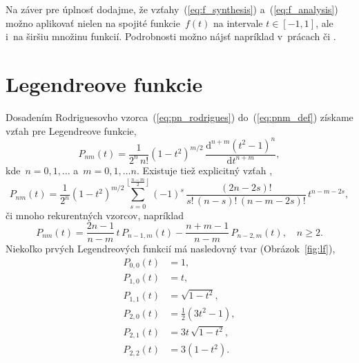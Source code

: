 \documentclass[a4paper, 12pt]{book}
\newcommand{\diff}{\mathrm d}
\begin{document}
Na záver pre úplnosť dodajme, že vzťahy~(\ref{eq:f_synthesis})
a~(\ref{eq:f_analysis}) možno aplikovať nielen na spojité funkcie~$f(t)$ na
intervale $t \in [-1, 1]$, ale i~na širšiu množinu funkcií.  Podrobnosti možno
nájsť napríklad v~prácach \textcite{Freeden2009} či \textcite{Arfken2005}.






\section{Legendreove funkcie}
\label{sec:legendre_functions}

Dosadením Rodriguesovho vzorca~(\ref{eq:pn_rodrigues}) do~(\ref{eq:pnm_def})
získame vzťah pre Legendreove funkcie,
%
\begin{equation}
\label{eq:pnm_ferrer}
P_{nm}(t) = \frac{1}{2^n \, n!} (1 - t^2)^{ m \slash 2} \, \frac{\diff^{n + m}
(t^2 - 1)^n}{\diff t^{n + m}}{,}
\end{equation}
%
kde~$n = 0, 1, \dots$ a~$m = 0, 1, \dots n$.  Existuje tiež explicitný vzťah 
\parencite{Freeden2009},
%
\begin{equation}
P_{nm}(t) = \frac{1}{2^n}(1 - t^2)^{m \slash 2} \sum_{s = 0}^{\left\lfloor
\frac{n - m}{2} \right\rfloor} (-1)^s \, \frac{(2n - 2s)!}{s! \, (n - s)! \, (n
- m - 2s)!} \, t^{n - m - 2s}{,}
\end{equation}
%
či mnoho rekurentných vzorcov, napríklad \parencite{Freeden2009}
%
\begin{equation}
\label{eq:pnm_recurrence}
P_{nm}(t) = \frac{2n - 1}{n - m} \, t \, P_{n - 1, m}(t) - \frac{n + m - 1}{n
- m} \, P_{n - 2, m}(t){,} \quad n \geq 2{.}
\end{equation}
%
Niekoľko prvých Legendreových funkcií má nasledovný tvar
(Obrázok~\ref{fig:lf}),
%
\begin{equation}
\label{eq:lf00_to_lf22}
\begin{split}
P_{0,0}(t) & = 1{,}\\
P_{1,0}(t) & = t{,}\\
P_{1,1}(t) & = \sqrt{1 - t^2}{,}\\
P_{2,0}(t) & = \frac{1}{2}(3t^2 - 1){,}\\
P_{2,1}(t) & = 3t \, \sqrt{1 - t^2}{,}\\
P_{2,2}(t) & = 3(1 - t^2){.}\\
\end{split}
\end{equation}
\end{document}
